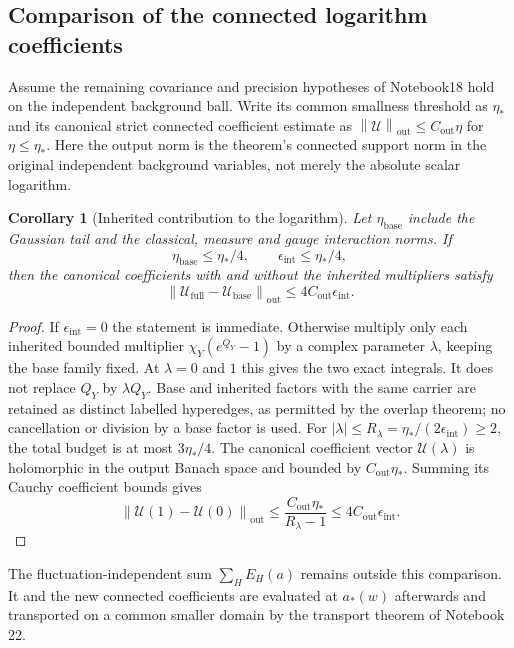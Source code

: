 \documentclass[11pt]{article}
\newtheorem{corollary}[theorem]{Corollary}
\theoremstyle{remark}
\newcommand{\norm}[1]{\left\|#1\right\|}
\begin{document}
\subsection{Comparison of the connected logarithm coefficients}

Assume the remaining covariance and precision hypotheses of
Notebook18 hold on the independent background ball. Write its
common smallness threshold as $\eta_*$ and its canonical strict
connected coefficient estimate as
$\norm{\mathcal U}_{\mathrm{out}}\le C_{\mathrm{out}}\eta$
for $\eta\le\eta_*$. Here the output norm is the theorem's
connected support norm in the original independent background
variables, not merely the absolute scalar logarithm.

\begin{corollary}[Inherited contribution to the logarithm]
\label{qi-log-comparison}
Let $\eta_{\mathrm{base}}$ include the Gaussian tail and the
classical, measure and gauge interaction norms. If
\[
 \eta_{\mathrm{base}}\le\eta_*/4,
 \qquad\epsilon_{\mathrm{int}}\le\eta_*/4,
\]
then the canonical coefficients with and without the inherited
multipliers satisfy
\begin{equation}\label{qi-log-bound}
 \norm{\mathcal U_{\mathrm{full}}-
             \mathcal U_{\mathrm{base}}}_{\mathrm{out}}
       \le4C_{\mathrm{out}}\epsilon_{\mathrm{int}}.
\end{equation}
\end{corollary}
\begin{proof}
If $\epsilon_{\mathrm{int}}=0$ the statement is immediate.
Otherwise multiply only each inherited bounded multiplier
$\chi_Y(e^{Q_Y}-1)$ by a complex parameter $\lambda$, keeping
the base family fixed. At $\lambda=0$ and $1$ this gives the
two exact integrals. It does not replace $Q_Y$ by $\lambda Q_Y$.
Base and inherited factors with the same carrier are retained
as distinct labelled hyperedges, as permitted by the overlap
theorem; no cancellation or division by a base factor is used.
For $|\lambda|\le R_\lambda=\eta_*/(2\epsilon_{\mathrm{int}})
\ge2$, the total budget is at most $3\eta_*/4$.
The canonical coefficient vector $\mathcal U(\lambda)$ is
holomorphic in the output Banach space and bounded by
$C_{\mathrm{out}}\eta_*$. Summing its Cauchy coefficient
bounds gives
\[
 \norm{\mathcal U(1)-\mathcal U(0)}_{\mathrm{out}}
 \le\frac{C_{\mathrm{out}}\eta_*}{R_\lambda-1}
 \le4C_{\mathrm{out}}\epsilon_{\mathrm{int}}.
\]
\end{proof}
The fluctuation-independent sum $\sum_HE_H(a)$ remains outside
this comparison. It and the new connected coefficients are
evaluated at $a_*(w)$ afterwards and transported on a common
smaller domain by the transport theorem of Notebook 22.
\end{document}
